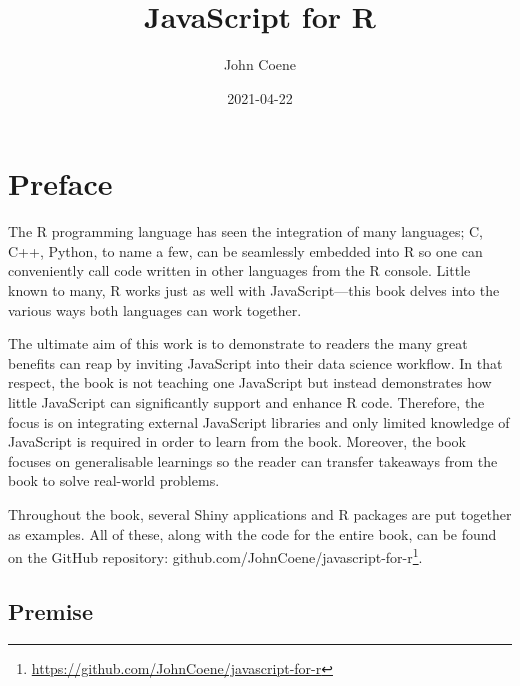 \documentclass[10pt,]{krantz}
\title{JavaScript for R}
\author{John Coene}
\date{2021-04-22}
\renewcommand{\href}[2]{#2\footnote{\url{#1}}}
\begin{document}
\maketitle


\thispagestyle{empty}

\begin{center}
\end{center}

\setlength{\abovedisplayskip}{-5pt}
\setlength{\abovedisplayshortskip}{-5pt}

{
\hypersetup{linkcolor=}
\setcounter{tocdepth}{2}
\tableofcontents
}
\listoffigures
\hypertarget{preface}{%
\chapter*{Preface}\label{preface}}


The R programming language has seen the integration of many languages; C, C++, Python, to name a few, can be seamlessly embedded into R so one can conveniently call code written in other languages from the R console. Little known to many, R works just as well with JavaScript---this book delves into the various ways both languages can work together.

The ultimate aim of this work is to demonstrate to readers the many great benefits can reap by inviting JavaScript into their data science workflow. In that respect, the book is not teaching one JavaScript but instead demonstrates how little JavaScript can significantly support and enhance R code. Therefore, the focus is on integrating external JavaScript libraries and only limited knowledge of JavaScript is required in order to learn from the book. Moreover, the book focuses on generalisable learnings so the reader can transfer takeaways from the book to solve real-world problems.

Throughout the book, several Shiny applications and R packages are put together as examples. All of these, along with the code for the entire book, can be found on the GitHub repository: \href{https://github.com/JohnCoene/javascript-for-r}{github.com/JohnCoene/javascript-for-r}.

\hypertarget{premise}{%
\section*{Premise}\label{premise}}
\end{document}
